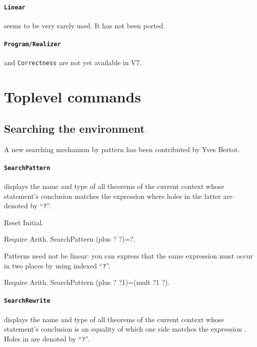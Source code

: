 \documentclass[11pt]{article}
\begin{document}
  \paragraph{{\tt Linear}} seems to be very rarely used. It has not
  been ported.

  \paragraph{{\tt Program/Realizer}} and {\tt Correctness} are not yet
  available in {\Coq} V7.

\section{Toplevel commands}

\subsection{Searching the environment}
\label{Search}
A new searching mechanism by pattern has been contributed by Yves Bertot.


\paragraph{{\tt SearchPattern {\term}}}
displays the name and type of all theorems of the current
context whose statement's conclusion matches the expression {\term}
where holes in the latter are denoted by ``{\tt ?}''.

\begin{coq_eval}
Reset Initial.
\end{coq_eval}
\begin{coq_example}
Require Arith.
SearchPattern (plus ? ?)=?.
\end{coq_example}

Patterns need not be linear: you can express that the same
expression must occur in two places by using indexed ``{\tt ?}''.

\begin{coq_example}
Require Arith.
SearchPattern (plus ? ?1)=(mult ?1 ?).
\end{coq_example}

\paragraph{{\tt SearchRewrite {\term}}}
displays the name and type of all theorems of the current
context whose statement's conclusion is an equality of which one side matches
the expression {\term}. Holes in {\term} are denoted by ``{\tt ?}''.
\end{document}
